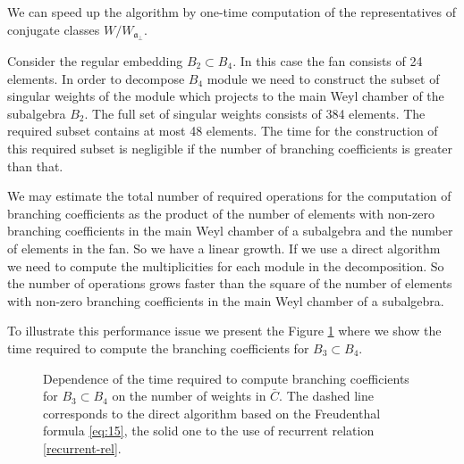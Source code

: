 \documentclass[preprint,12pt]{elsarticle}
\newcommand{\afb}{\mathfrak{a}_{\bot}}
\begin{document}
We can speed up the algorithm by
one-time computation of the representatives of conjugate classes $W/W_{\afb }$.

Consider the regular embedding $B_{2}\subset B_{4}$. In this case the fan consists of 24 elements. In order to decompose $B_{4}$ module we need to construct the subset of singular weights of the module which projects to the main Weyl chamber of the subalgebra $B_{2}$. The full set of singular weights consists of 384 elements. The required subset contains at most 48 elements. The time for the construction of this required subset is negligible if the number of branching coefficients is greater than that.

 We may estimate the total number of required operations for the computation of branching coefficients as the product of the number of elements with non-zero branching coefficients  in the main Weyl chamber of a subalgebra  and the number of elements in the fan. So we have a linear growth.  If we use a direct algorithm we need to compute the multiplicities for each module in the decomposition. So the number of operations grows faster than the square of the number of elements with non-zero branching coefficients in the main Weyl chamber of a subalgebra. 

To illustrate this performance issue we present the Figure \ref{fig:branching} where we show the time required to compute the branching coefficients for $B_{3}\subset B_{4}$.

\begin{figure}[h]
  \noindent{}
  \caption{Dependence of the time required to compute branching coefficients for $B_{3}\subset B_{4}$ on  the number of weights in $\bar C$. The dashed line corresponds to the direct  algorithm based on the Freudenthal formula \eqref{eq:15}, the solid one to the use of recurrent relation \eqref{recurrent-rel}.}
  \label{fig:branching}
\end{figure}
\end{document}
